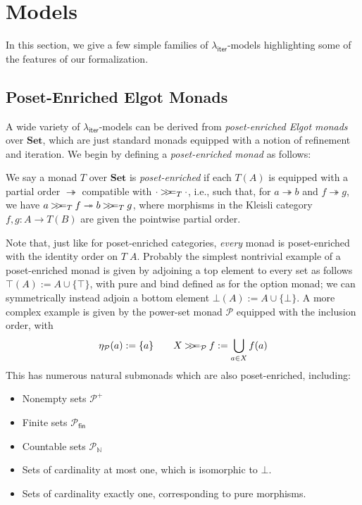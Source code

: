 \documentclass[acmsmall,screen,anonymous,review]{acmart}
\newcommand{\mc}[1]{\ensuremath{\mathcal{#1}}}
\newcommand{\mb}[1]{\ensuremath{\mathbf{#1}}}
\newcommand{\ms}[1]{\ensuremath{\mathsf{#1}}}
\newcommand{\nats}{\mathbb{N}}
\newcommand{\tref}{\twoheadrightarrow}
\newcommand{\subiterexp}{\texorpdfstring{\(\lambda_{\ms{iter}}\)}{lambda-iter}}
\newcommand{\obind}{\mathbin{>\!\!>\mkern-6.7mu=}}
\newcommand{\mbind}[3]{#2 \obind_{#1} #3}
\begin{document}
\section{Models}

\label{apx:models}

In this section, we give a few simple families of \subiterexp{}-models highlighting some of the
features of our formalization.

\subsection{Poset-Enriched Elgot Monads}

A wide variety of \subiterexp{}-models can be derived from \emph{poset-enriched Elgot monads} over
$\mb{Set}$, which are just standard monads equipped with a notion of refinement and iteration. We
begin by defining a \emph{poset-enriched monad} as follows:
\begin{definition}
  We say a monad $T$ over $\mb{Set}$ is \emph{poset-enriched} if each $T(A)$ is equipped with a
  partial order $\tref$ compatible with $\mbind{T}{\cdot}{\cdot}$, i.e., such that, for $a \tref b$
  and $f \tref g$, we have $\mbind{T}{a}{f} \tref \mbind{T}{b}{g}$, where morphisms in the Kleisli
  category $f, g : A \to T(B)$ are given the pointwise partial order.
\end{definition}
Note that, just like for poset-enriched categories, \emph{every} monad is poset-enriched with the
identity order on $T\;A$. Probably the simplest nontrivial example of a poset-enriched monad is
given by adjoining a top element to every set as follows $\top(A) := A \cup \{\top\}$, with pure and
bind defined as for the option monad; we can symmetrically instead adjoin a bottom element $\bot(A)
:= A \cup \{\bot\}$. A more complex example is given by the power-set monad $\mc{P}$ equipped with
the inclusion order, with
\begin{equation}
  \eta_{\mc{P}}(a) := \{a\} \qquad
  \mbind{\mc{P}}{X}{f} := \bigcup_{a \in X}f(a) 
\end{equation}
This has numerous natural submonads which are also poset-enriched, including:
\begin{itemize}
  \item Nonempty sets $\mc{P}^+$
  \item Finite sets $\mc{P}_{\ms{fin}}$
  \item Countable sets $\mc{P}_{\nats}$
  \item Sets of cardinality at most one, which is isomorphic to $\bot$.
  \item Sets of cardinality exactly one, corresponding to pure morphisms.
\end{itemize}
\end{document}
